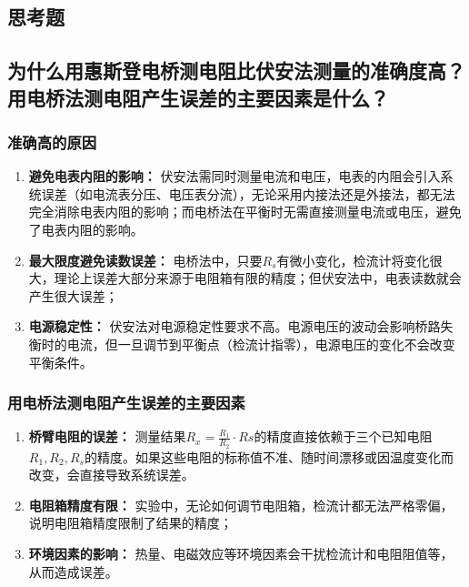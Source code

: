 \documentclass[]{../template/Report}%
\begin{document}
\begin{fullreportonly}
    \section{思考题}
    \subsection{为什么用惠斯登电桥测电阻比伏安法测量的准确度高？用电桥法测电阻产生误差的主要因素是什么？}

    \subsubsection{准确高的原因}
    \begin{enumerate}
        \item \textbf{避免电表内阻的影响：} 伏安法需同时测量电流和电压，电表的内阻会引入系统误差（如电流表分压、电压表分流），无论采用内接法还是外接法，都无法完全消除电表内阻的影响；而电桥法在平衡时无需直接测量电流或电压，避免了电表内阻的影响。

        \item \textbf{最大限度避免读数误差：} 电桥法中，只要$R_s$有微小变化，检流计将变化很大，理论上误差大部分来源于电阻箱有限的精度；但伏安法中，电表读数就会产生很大误差；

        \item \textbf{电源稳定性：} 伏安法对电源稳定性要求不高。电源电压的波动会影响桥路失衡时的电流，但一旦调节到平衡点（检流计指零），电源电压的变化不会改变平衡条件。
    \end{enumerate}
    \subsubsection{用电桥法测电阻产生误差的主要因素}
    \begin{enumerate}
        \item \textbf{桥臂电阻的误差：} 测量结果$ R_x = \frac{R_1}{R_2} \cdot Rs $的精度直接依赖于三个已知电阻$R_1, R_2, R_s$的精度。如果这些电阻的标称值不准、随时间漂移或因温度变化而改变，会直接导致系统误差。
        \item \textbf{电阻箱精度有限：} 实验中，无论如何调节电阻箱，检流计都无法严格零偏，说明电阻箱精度限制了结果的精度；
        \item \textbf{环境因素的影响：} 热量、电磁效应等环境因素会干扰检流计和电阻阻值等，从而造成误差。
    \end{enumerate}

\end{fullreportonly}
\end{document}
